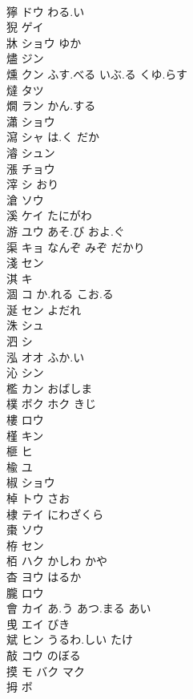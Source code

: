 \documentclass[8pt]{extreport}
\begin{document}
\begin{CJK}{UTF8}{min}
\\	獰	ドウ わる.い			
\\	猊	ゲイ			
\\	牀	ショウ ゆか					
\\	燼	ジン			
\\	燻	クン ふす.べる いぶ.る くゆ.らす			
\\	燵	タツ			
\\	燗	ラン かん.する			
\\	瀟	ショウ			
\\	瀉	シャ は.く だか			
\\	濬	シュン			
\\	漲	チョウ			
\\	滓	シ おり			
\\	滄	ソウ			
\\	溪	ケイ たにがわ			
\\	游	ユウ あそ.び およ.ぐ			
\\	渠	キョ なんぞ みぞ だかり			
\\	淺	セン					
\\	淇	キ			
\\	涸	コ か.れる こお.る			
\\	涎	セン よだれ			
\\	洙	シュ			
\\	泗	シ			
\\	泓	オオ ふか.い			
\\	沁	シン			
\\	檻	カン おばしま			
\\	樸	ボク ホク きじ			
\\	樓	ロウ			
\\	槿	キン			
\\	榧	ヒ			
\\	楡	ユ			
\\	椒	ショウ			
\\	棹	トウ さお			
\\	棣	テイ にわざくら			
\\	棗	ソウ			
\\	栫	セン			
\\	栢	ハク かしわ かや			
\\	杳	ヨウ はるか			
\\	朧	ロウ			
\\	會	カイ あ.う あつ.まる あい			
\\	曵	エイ びき					
\\	斌	ヒン うるわ.しい たけ			
\\	敲	コウ のぼる			
\\	摸	モ バク マク			
\\	拇	ボ			

\end{CJK}
\end{document}
